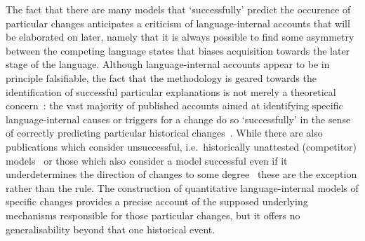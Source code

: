 The fact that there are many models that `successfully' predict the occurence of particular changes anticipates a criticism of language-internal accounts that will be elaborated on later, namely that it is always possible to find some asymmetry between the competing language states that biases acquisition towards the later stage of the language.
Although language-internal accounts appear to be in principle falsifiable, the fact that the methodology is geared towards the identification of successful particular explanations is not merely a theoretical concern~\citep{Lass1980}: the vast majority of published accounts aimed at identifying specific language-internal causes or triggers for a change do so `successfully' in the sense of correctly predicting particular historical changes~\citep[e.g.][among many others]{Troutman2008,Ritt2012,VanTrijp2013}. While there are also publications which consider unsuccessful, i.e.~historically unattested (competitor) models~\citep[e.g.][]{Sonderegger2010} or those which also consider a model successful even if it underdetermines the direction of changes to some degree~\citep[e.g.][]{Lau2016} these are the exception rather than the rule.
The construction of quantitative language-internal models of specific changes provides a precise account of the supposed underlying mechanisms responsible for those particular changes, but it offers no generalisability beyond that one historical event. %

